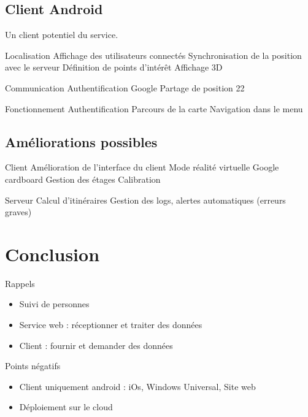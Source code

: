 \documentclass{beamer} %
\begin{document}
\subsection{Client Android}
\begin{frame}{\subsecname}
  Un client potentiel du service.

  Localisation
  Affichage des utilisateurs connectés
  Synchronisation de la position avec le serveur
  Définition de points d’intérêt
  Affichage 3D

  Communication
  Authentification Google
  Partage de position
  22

  Fonctionnement
  Authentification
  Parcours de la carte
  Navigation dans le menu
  
\end{frame}

\subsection{Améliorations possibles}
\begin{frame}{\subsecname}
  Client
    Amélioration de l’interface du client
    Mode réalité virtuelle
      Google cardboard
    Gestion des étages
      Calibration

  Serveur
    Calcul d’itinéraires
    Gestion des logs, alertes automatiques (erreurs graves)
  
\end{frame}
  

  \section{Conclusion}
  \begin{frame}{\secname}
      \begin{block}{Rappels}
        \begin{itemize}
          \item Suivi de personnes
          \item Service web : réceptionner et traiter des données
          \item Client : fournir et demander des données
        \end{itemize}
      \end{block}

      \pause

      \begin{alertblock}{Points négatifs}
        \begin{itemize}
          \item Client uniquement android : iOs, Windows Universal, Site web
          \item Déploiement sur le cloud
        \end{itemize}
      \end{alertblock}

  \end{frame}
\end{document}
